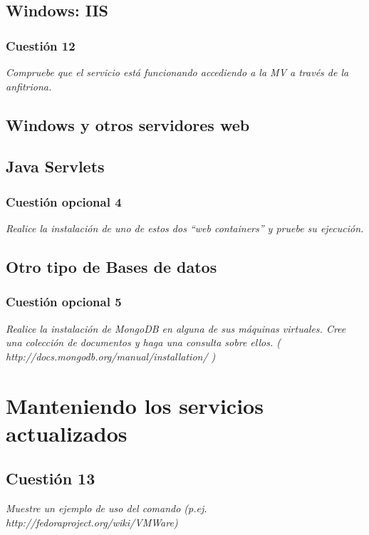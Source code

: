 \subsection{Windows: IIS}
\subsubsection{Cuestión 12}
\textit{Compruebe que el servicio está funcionando accediendo a la MV a través de la anfitriona.}


\subsection{Windows y otros servidores web}

\subsection{Java Servlets}
\subsubsection{Cuestión opcional 4}
\textit{Realice la instalación de uno de estos dos “web containers” y pruebe su ejecución.}


\subsection{Otro tipo de Bases de datos}
\subsubsection{Cuestión opcional 5}
\textit{Realice la instalación de MongoDB en alguna de sus máquinas virtuales. Cree una colección de documentos y haga una consulta sobre ellos. ( http://docs.mongodb.org/manual/installation/ )}


\section{Manteniendo los servicios actualizados}
\subsection{Cuestión 13}
\textit{Muestre un ejemplo de uso del comando (p.ej. http://fedoraproject.org/wiki/VMWare)}


